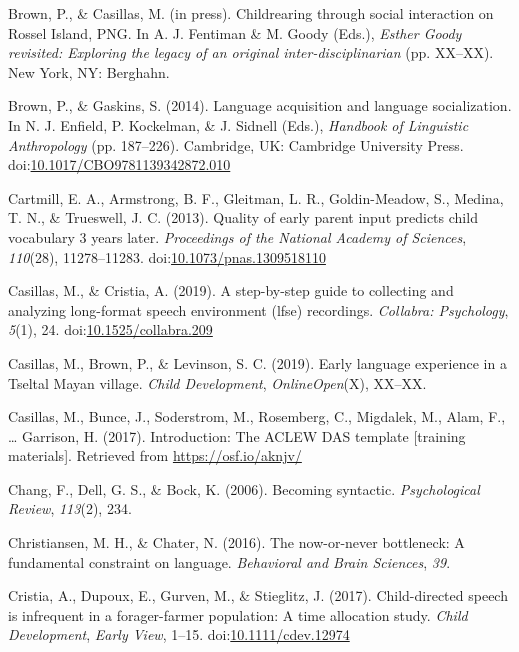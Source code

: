 \documentclass[,man,floatsintext]{apa6}
\begin{document}
\hypertarget{ref-brownIPchildrearing}{}
Brown, P., \& Casillas, M. (in press). Childrearing through social
interaction on Rossel Island, PNG. In A. J. Fentiman \& M. Goody (Eds.),
\emph{Esther Goody revisited: Exploring the legacy of an original
inter-disciplinarian} (pp. XX--XX). New York, NY: Berghahn.

\hypertarget{ref-brown2014language}{}
Brown, P., \& Gaskins, S. (2014). Language acquisition and language
socialization. In N. J. Enfield, P. Kockelman, \& J. Sidnell (Eds.),
\emph{Handbook of Linguistic Anthropology} (pp. 187--226). Cambridge,
UK: Cambridge University Press.
doi:\href{https://doi.org/10.1017/CBO9781139342872.010}{10.1017/CBO9781139342872.010}

\hypertarget{ref-cartmill2013quality}{}
Cartmill, E. A., Armstrong, B. F., Gleitman, L. R., Goldin-Meadow, S.,
Medina, T. N., \& Trueswell, J. C. (2013). Quality of early parent input
predicts child vocabulary 3 years later. \emph{Proceedings of the
National Academy of Sciences}, \emph{110}(28), 11278--11283.
doi:\href{https://doi.org/10.1073/pnas.1309518110}{10.1073/pnas.1309518110}

\hypertarget{ref-casillas2019stepbystep}{}
Casillas, M., \& Cristia, A. (2019). A step-by-step guide to collecting
and analyzing long-format speech environment (lfse) recordings.
\emph{Collabra: Psychology}, \emph{5}(1), 24.
doi:\href{https://doi.org/10.1525/collabra.209}{10.1525/collabra.209}

\hypertarget{ref-casillas2019early}{}
Casillas, M., Brown, P., \& Levinson, S. C. (2019). Early language
experience in a Tseltal Mayan village. \emph{Child Development},
\emph{OnlineOpen}(X), XX--XX.

\hypertarget{ref-casillas2017ACLEWDAS}{}
Casillas, M., Bunce, J., Soderstrom, M., Rosemberg, C., Migdalek, M.,
Alam, F., \ldots{} Garrison, H. (2017). Introduction: The ACLEW DAS
template {[}training materials{]}. Retrieved from
\url{https://osf.io/aknjv/}

\hypertarget{ref-chang2006becoming}{}
Chang, F., Dell, G. S., \& Bock, K. (2006). Becoming syntactic.
\emph{Psychological Review}, \emph{113}(2), 234.

\hypertarget{ref-christiansen2016now}{}
Christiansen, M. H., \& Chater, N. (2016). The now-or-never bottleneck:
A fundamental constraint on language. \emph{Behavioral and Brain
Sciences}, \emph{39}.

\hypertarget{ref-cristia2017child}{}
Cristia, A., Dupoux, E., Gurven, M., \& Stieglitz, J. (2017).
Child-directed speech is infrequent in a forager-farmer population: A
time allocation study. \emph{Child Development}, \emph{Early View},
1--15. doi:\href{https://doi.org/10.1111/cdev.12974}{10.1111/cdev.12974}
\end{document}
